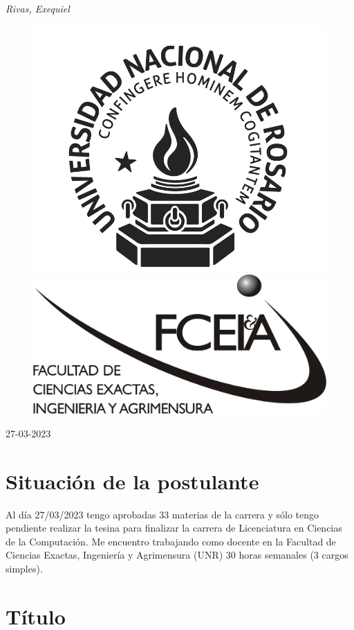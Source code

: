 \documentclass[11pt,a4paper]{article}
\begin{document}
\begin{titlepage}
    {\itshape\LARGE Rivas, Exequiel}
	
	\vspace{0.5\baselineskip} %
 
	\vspace*{6\baselineskip} %
    
    \begin{figure}[h] %
	\centering
	\includegraphics[width=0.4\linewidth]{Logo-Unr-1.png} \hfill \includegraphics[width=0.4\linewidth]{FCEIA.jpeg}
	\end{figure}
    
    \vfill %
	
		
	\vspace{0.3\baselineskip} %
	
	27-03-2023 %
	

\end{titlepage}



\section{Situación de la postulante}

Al día 27/03/2023 tengo aprobadas 33 materias de la carrera y sólo
tengo pendiente realizar la tesina para finalizar la carrera de
Licenciatura en Ciencias de la Computación. Me encuentro trabajando
como docente en la Facultad de Ciencias Exactas, Ingeniería y
Agrimensura (UNR) 30 horas semanales (3 cargos simples).

\section{Título}
\end{document}
